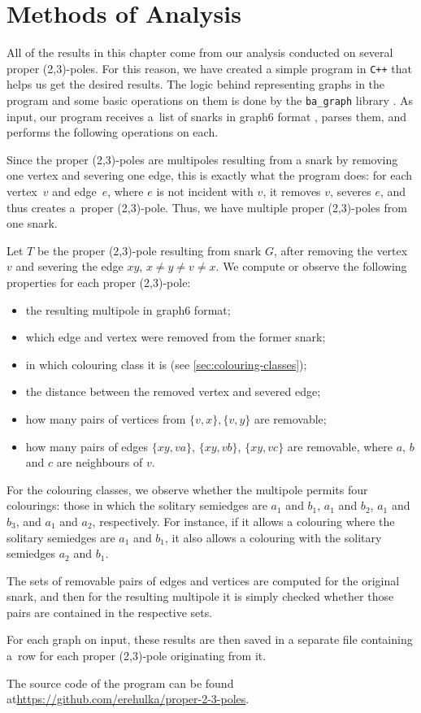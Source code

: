 \section{Methods of Analysis}\label{sec:analysis}

All of the results in this chapter come from our analysis conducted on several proper (2,3)-poles. For this reason, we have created a simple program in \texttt{C++} that helps us get the desired results. The logic behind representing graphs in the program and some basic operations on them is done by the \texttt{ba\_graph} library \cite{ba-graph}. As input, our program receives a~list of snarks in graph6 format \cite{mckay_formats}, parses them, and performs the following operations on each.

Since the proper (2,3)-poles are multipoles resulting from a snark by removing one vertex and severing one edge, this is exactly what the program does: for each vertex~$v$ and edge~$e$, where $e$ is not incident with $v$, it removes $v$, severes $e$, and thus creates a~proper (2,3)-pole. Thus, we have multiple proper (2,3)-poles from one snark.

Let $T$ be the proper (2,3)-pole resulting from snark $G$, after removing the vertex $v$ and severing the edge $xy$, $x\neq y\neq v\neq x$. We compute or observe the following properties for each proper (2,3)-pole:

\begin{itemize}
	\item the resulting multipole in graph6 format;
	\item which edge and vertex were removed from the former snark;
	\item in which colouring class it is (see \cref{sec:colouring-classes});
	\item the distance between the removed vertex and severed edge;
	\item how many pairs of vertices from $\{v,x\},\{v,y\}$ are removable;
	\item how many pairs of edges $\{xy, va\}$, $\{xy, vb\}$, $\{xy, vc\}$ are removable, where $a$, $b$ and $c$ are neighbours of $v$.
\end{itemize}

For the colouring classes, we observe whether the multipole permits four colourings: those in which the solitary semiedges are $a_1$ and $b_1$, $a_1$ and $b_2$, $a_1$ and $b_3$, and $a_1$ and $a_2$, respectively. For instance, if it allows a colouring where the solitary semiedges are $a_1$ and $b_1$, it also allows a colouring with the solitary semiedges $a_2$ and $b_1$.

The sets of removable pairs of edges and vertices are computed for the original snark, and then for the resulting multipole it is simply checked whether those pairs are contained in the respective sets.

For each graph on input, these results are then saved in a separate file containing a~row for each proper (2,3)-pole originating from it.

The source code of the program can be found at\newline \url{https://github.com/erehulka/proper-2-3-poles}.